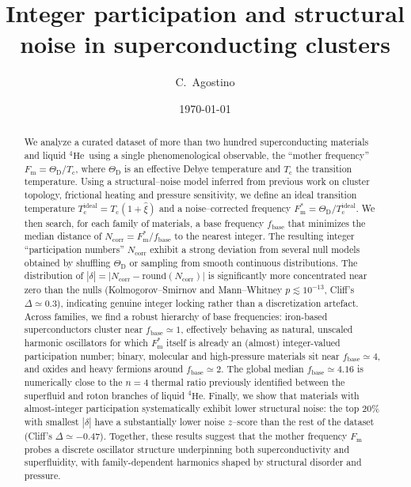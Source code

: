 \documentclass[aps,prb,twocolumn,superscriptaddress,floatfix,nofootinbib]{revtex4-2}
\newcommand{\Tc}{\ensuremath{T_{\mathrm{c}}}}
\newcommand{\Tcone}{\ensuremath{{T_{\mathrm{c}}^{\mathrm{ideal}}}}}
\newcommand{\ThetaD}{\ensuremath{\Theta_{\mathrm{D}}}}
\newcommand{\Fm}{\ensuremath{F_{\mathrm{m}}}}
\newcommand{\Fmstar}{\ensuremath{{F_{\mathrm{m}}^{\ast}}}}
\newcommand{\fbase}{\ensuremath{{f_{\mathrm{base}}}}}
\newcommand{\Ncorr}{\ensuremath{{N_{\mathrm{corr}}}}}
\newcommand{\deltalock}{\ensuremath{\delta}}
\newcommand{\He}{\ensuremath{\mathrm{He}}}
\newcommand{\HeFour}{\ensuremath{{^{4}\He}}}
\begin{document}
\title{Integer participation and structural noise in superconducting clusters}

\author{C.~Agostino}

\date{\today}

\begin{abstract}
We analyze a curated dataset of more than two hundred superconducting materials
and liquid \HeFour\ using a single phenomenological observable,
the ``mother frequency'' $\Fm = \ThetaD / \Tc$,
where $\ThetaD$ is an effective Debye temperature and $\Tc$ the transition temperature.
Using a structural--noise model inferred from previous work on cluster topology, frictional heating and pressure sensitivity, we define an
ideal transition temperature
$\Tcone = \Tc (1 + \widehat{\xi})$ and a noise--corrected
frequency $\Fmstar = \ThetaD / \Tcone$.
We then search, for each family of materials, a base frequency
$\fbase$ that minimizes the median distance of
$N_{\mathrm{corr}} = \Fmstar / \fbase$ to the nearest integer.
The resulting integer ``participation numbers'' $N_{\mathrm{corr}}$ exhibit
a strong deviation from several null models
obtained by shuffling $\ThetaD$ or sampling from smooth continuous distributions.
The distribution of $|\deltalock| = |\Ncorr - \mathrm{round}(\Ncorr)|$
is significantly more concentrated near zero than the nulls
(Kolmogorov--Smirnov and Mann--Whitney $p \lesssim 10^{-13}$,
Cliff's $\Delta \simeq 0.3$),
indicating genuine integer locking rather than a discretization artefact.
Across families, we find a robust hierarchy of base frequencies:
iron-based superconductors cluster near $\fbase \simeq 1$,
effectively behaving as natural, unscaled harmonic oscillators for which
$\Fmstar$ itself is already an (almost) integer-valued participation number;
binary, molecular and high-pressure materials sit near $\fbase \simeq 4$,
and oxides and heavy fermions around $\fbase \simeq 2$.
The global median $\fbase \simeq 4.16$ is numerically close
to the $n=4$ thermal ratio previously identified between the
superfluid and roton branches of liquid \HeFour.
Finally, we show that materials with almost-integer participation
systematically exhibit lower structural noise:
the top 20\% with smallest $|\deltalock|$ have a substantially
lower noise $z$--score than the rest of the dataset
(Cliff's $\Delta \simeq -0.47$).
Together, these results suggest that the mother frequency $\Fm$
probes a discrete oscillator structure underpinning both superconductivity
and superfluidity, with family-dependent harmonics shaped
by structural disorder and pressure.
\end{abstract}
\end{document}
